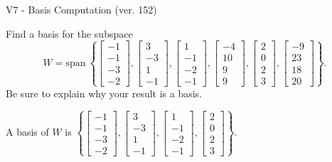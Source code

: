 \begin{exercise}
  \begin{exerciseTitle}V7 - Basis Computation (ver. 152)\end{exerciseTitle}
  \begin{exerciseStatement}
    Find a basis for the subspace 
\[W=\mathrm{span}\ \left\{\left[\begin{array}{r}
-1 \\
-1 \\
-3 \\
-2
\end{array}\right] , \left[\begin{array}{r}
3 \\
-3 \\
1 \\
-1
\end{array}\right] , \left[\begin{array}{r}
1 \\
-1 \\
-2 \\
-1
\end{array}\right] , \left[\begin{array}{r}
-4 \\
10 \\
9 \\
9
\end{array}\right] , \left[\begin{array}{r}
2 \\
0 \\
2 \\
3
\end{array}\right] , \left[\begin{array}{r}
-9 \\
23 \\
18 \\
20
\end{array}\right]\right\}.\]
 Be sure to explain why your result is a basis.


  \end{exerciseStatement}
  \begin{exerciseAnswer}
   A basis of \(W\) is  \(\left\{\left[\begin{array}{r}
-1 \\
-1 \\
-3 \\
-2
\end{array}\right] , \left[\begin{array}{r}
3 \\
-3 \\
1 \\
-1
\end{array}\right] , \left[\begin{array}{r}
1 \\
-1 \\
-2 \\
-1
\end{array}\right] , \left[\begin{array}{r}
2 \\
0 \\
2 \\
3
\end{array}\right]\right\}\).
  


  \end{exerciseAnswer}
\end{exercise}